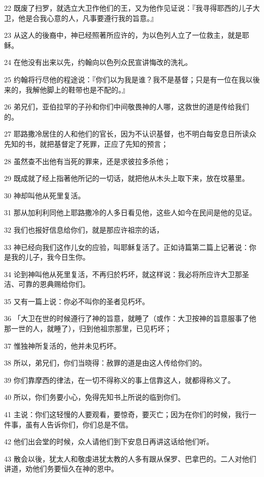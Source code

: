 \par 22 既废了扫罗，就选立大卫作他们的王，又为他作见证说：『我寻得耶西的儿子大卫，他是合我心意的人，凡事要遵行我的旨意。』
\par 23 从这人的後裔中，神已经照著所应许的，为以色列人立了一位救主，就是耶稣。
\par 24 在他没有出来以先，约翰向以色列众民宣讲悔改的洗礼。
\par 25 约翰将行尽他的程途说：『你们以为我是谁？我不是基督；只是有一位在我以後来的，我解他脚上的鞋带也是不配的。』
\par 26 弟兄们，亚伯拉罕的子孙和你们中间敬畏神的人哪，这救世的道是传给我们的。
\par 27 耶路撒冷居住的人和他们的官长，因为不认识基督，也不明白每安息日所读众先知的书，就把基督定了死罪，正应了先知的预言；
\par 28 虽然查不出他有当死的罪来，还是求彼拉多杀他；
\par 29 既成就了经上指著他所记的一切话，就把他从木头上取下来，放在坟墓里。
\par 30 神却叫他从死里复活。
\par 31 那从加利利同他上耶路撒冷的人多日看见他，这些人如今在民间是他的见证。
\par 32 我们也报好信息给你们，就是那应许祖宗的话，
\par 33 神已经向我们这作儿女的应验，叫耶稣复活了。正如诗篇第二篇上记著说：你是我的儿子，我今日生你。
\par 34 论到神叫他从死里复活，不再归於朽坏，就这样说：我必将所应许大卫那圣洁、可靠的恩典赐给你们。
\par 35 又有一篇上说：你必不叫你的圣者见朽坏。
\par 36 「大卫在世的时候遵行了神的旨意，就睡了（或作：大卫按神的旨意服事了他那一世的人，就睡了），归到他祖宗那里，已见朽坏；
\par 37 惟独神所复活的，他并未见朽坏。
\par 38 所以，弟兄们，你们当晓得：赦罪的道是由这人传给你们的。
\par 39 你们靠摩西的律法，在一切不得称义的事上信靠这人，就都得称义了。
\par 40 所以，你们务要小心，免得先知书上所说的临到你们。
\par 41 主说：你们这轻慢的人要观看，要惊奇，要灭亡；因为在你们的时候，我行一件事，虽有人告诉你们，你们总是不信。
\par 42 他们出会堂的时候，众人请他们到下安息日再讲这话给他们听。
\par 43 散会以後，犹太人和敬虔进犹太教的人多有跟从保罗、巴拿巴的。二人对他们讲道，劝他们务要恒久在神的恩中。
